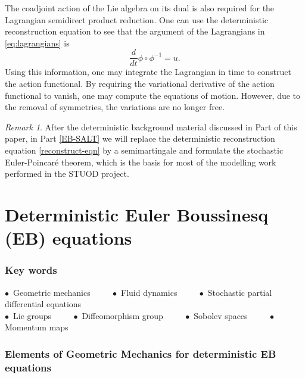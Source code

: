 \documentclass[11pt, oneside]{article}   	%
\numberwithin{equation}{section}
\theoremstyle{plain}
\theoremstyle{definition}
\theoremstyle{remark}
\newtheorem{remark}[theorem]{Remark}
\newcommand{\<}{\langle}
\renewcommand{\>}{\rangle}
\begin{document}
The coadjoint action of the Lie algebra on its dual is also required for the Lagrangian semidirect product reduction. One can use the deterministic reconstruction equation to see that the argument of the Lagrangians in \eqref{eq:lagrangians} is
\begin{equation}
\frac{d}{dt}\phi\circ \phi^{-1} = u.
\label{reconstruct-eqn}
\end{equation}
Using this information, one may integrate the Lagrangian in time to construct the action functional. By requiring the variational derivative of the action functional to vanish, one may compute the equations of motion. However, due to the removal of symmetries, the variations are no longer free. 

\begin{remark}
After the deterministic background material discussed in Part \ref{Determ-EBeqns} of this paper, in Part \ref{EB-SALT} we will replace the deterministic reconstruction equation \eqref{reconstruct-eqn} by a semimartingale and formulate the stochastic Euler-Poincar\'e theorem, which is the basis for most of the modelling work performed in the STUOD project.
\end{remark}

\newpage

\part{Deterministic Euler Boussinesq (EB) equations}\label{Determ-EBeqns}

\section*{Key words}
\begin{center}
$\bullet\,$ Geometric mechanics $\qquad$ $\bullet\,$ Fluid dynamics $\qquad$ $\bullet\,$ Stochastic partial differential equations\\
$\bullet\,$ Lie groups $\qquad$ $\bullet\,$ Diffeomorphism group $\qquad$ $\bullet\,$ Sobolev spaces $\qquad$ $\bullet\,$ Momentum maps
\end{center}
 
\section{Elements of Geometric Mechanics for deterministic EB equations}
\end{document}
